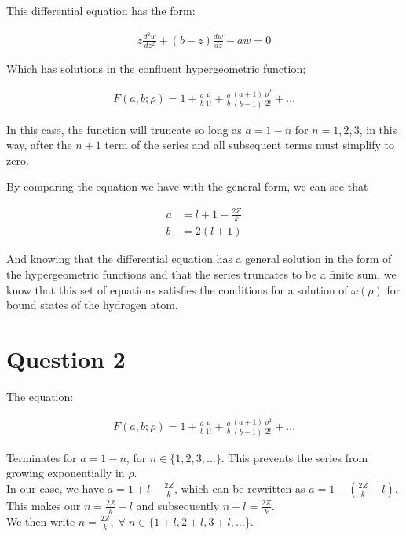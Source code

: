 \documentclass{article}
\begin{document}
    This differential equation has the form:

    \begin{gather}
        z\frac{d^2w}{dz^2} + (b-z)\frac{dw}{dz} - aw = 0
    \end{gather}

    Which has solutions in the confluent hypergeometric function;

    \begin{gather}
        F(a,b;\rho) = 1 + \frac{a}{b}\frac{\rho}{1!} + \frac{a}{b}\frac{(a+1)}{(b+1)}\frac{\rho^2}{2!} + \dots
    \end{gather}
    
    In this case, the function will truncate so long as $a=1-n$ for $n=1,2,3$,
    in this way, after the $n+1$ term of the series and all subsequent terms must simplify to zero.

    By comparing the equation we have with the general form, we can see that

    \begin{align}
        a &= l+1 - \frac{2Z}{k}\\
        b &= 2(l+1)
    \end{align}

    And knowing that the differential equation has a general solution in the form of the hypergeometric functions
    and that the series truncates to be a finite sum, we know that this set of equations 
    satisfies the conditions for a solution of $\omega(\rho)$ for bound states of the hydrogen atom.



\section{Question 2}

    The equation:

    \begin{gather}
        F(a,b;\rho) = 1 + \frac{a}{b}\frac{\rho}{1!} + \frac{a}{b}\frac{(a+1)}{(b+1)}\frac{\rho^2}{2!} + \dots
    \end{gather}

    Terminates for $a = 1 - n$, for $n \in \{1,2,3,\dots\}$. 
    This prevents the series from growing exponentially in $\rho$.\\

    In our case, we have $a = 1 + l - \frac{2Z}{k}$, which can be rewritten as $a = 1 - (\frac{2Z}{k}-l)$.\\
    This makes our $n = \frac{2Z}{k}-l$ and subsequently $n+l=\frac{2Z}{k}$.\\ 
    \smallskip
    We then write $n=\frac{2Z}{k}, \;\forall\; n \in \{1 + l, 2 + l, 3 + l, \dots$\}.\\
\end{document}
